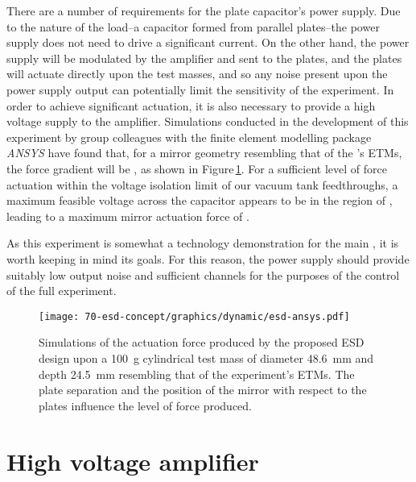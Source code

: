 There are a number of requirements for the plate capacitor's power supply. Due to the nature of the load--a capacitor formed from parallel plates--the power supply does not need to drive a significant current. On the other hand, the power supply will be modulated by the amplifier and sent to the plates, and the plates will actuate directly upon the test masses, and so any noise present upon the power supply output can potentially limit the sensitivity of the experiment. In order to achieve significant actuation, it is also necessary to provide a high voltage supply to the amplifier. Simulations conducted in the development of this experiment by group colleagues with the finite element modelling package \emph{ANSYS} have found that, for a mirror geometry resembling that of the \SSMEXPT's ETMs, the force gradient will be \ESDFORCEGRAD, as shown in Figure\,\ref{fig:esd-ansys}. For a sufficient level of force actuation within the voltage isolation limit of our vacuum tank feedthroughs, a maximum feasible voltage across the capacitor appears to be in the region of \ESDMAXVOLTAGE, leading to a maximum mirror actuation force of \ESDMAXFORCE.

As this experiment is somewhat a technology demonstration for the main \SSMEXPT, it is worth keeping in mind its goals. For this reason, the power supply should provide suitably low output noise and sufficient channels for the purposes of the control of the full experiment.

\begin{figure}
  \begin{center}
    \texttt{[image: 70-esd-concept/graphics/dynamic/esd-ansys.pdf]}
    \caption{Simulations of the actuation force produced by the proposed ESD design upon a \SI{100}{\gram} cylindrical test mass of diameter \SI{48.6}{\milli\meter} and depth \SI{24.5}{\milli\meter} resembling that of the \SSM experiment's ETMs. The plate separation and the position of the mirror with respect to the plates influence the level of force produced. }
    \label{fig:esd-ansys}
  \end{center}
\end{figure}

\section{High voltage amplifier}

